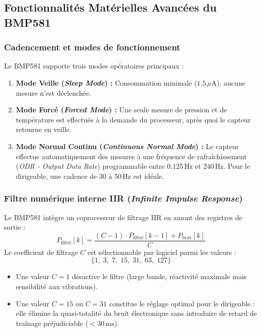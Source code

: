\documentclass[../Materiel.tex]{subfiles}
\begin{document}
\subsection{Fonctionnalités Matérielles Avancées du BMP581}

\subsubsection{Cadencement et modes de fonctionnement}
Le BMP581 supporte trois modes opératoires principaux :
\begin{enumerate}
    \item \textbf{Mode Veille (\textit{Sleep Mode}) :} Consommation minimale ($1.5\,\mu\text{A}$), aucune mesure n'est déclenchée.
    \item \textbf{Mode Forcé (\textit{Forced Mode}) :} Une seule mesure de pression et de température est effectuée à la demande du processeur, après quoi le capteur retourne en veille.
    \item \textbf{Mode Normal Continu (\textit{Continuous Normal Mode}) :} Le capteur effectue automatiquement des mesures à une fréquence de rafraîchissement (\textit{ODR - Output Data Rate}) programmable entre $0.125\,\text{Hz}$ et \textbf{$240\,\text{Hz}$}. Pour le dirigeable, une cadence de $30\text{ à }50\,\text{Hz}$ est idéale.
\end{enumerate}

\subsubsection{Filtre numérique interne IIR (\textit{Infinite Impulse Response})}
Le BMP581 intègre un coprocesseur de filtrage IIR en amont des registres de sortie :
\begin{equation}
    P_{\text{filtré}}[k] = \frac{(C-1) \cdot P_{\text{filtré}}[k-1] + P_{\text{brut}}[k]}{C}
\end{equation}
Le coefficient de filtrage $C$ est sélectionnable par logiciel parmi les valeurs :
$$\{1, \; 3, \; 7, \; 15, \; 31, \; 63, \; 127\}$$
\begin{itemize}
    \item Une valeur $C=1$ désactive le filtre (large bande, réactivité maximale mais sensibilité aux vibrations).
    \item Une valeur $C=15$ ou $C=31$ constitue le réglage optimal pour le dirigeable : elle élimine la quasi-totalité du bruit électronique sans introduire de retard de traînage préjudiciable ($< 30\,\text{ms}$).
\end{itemize}
\end{document}
